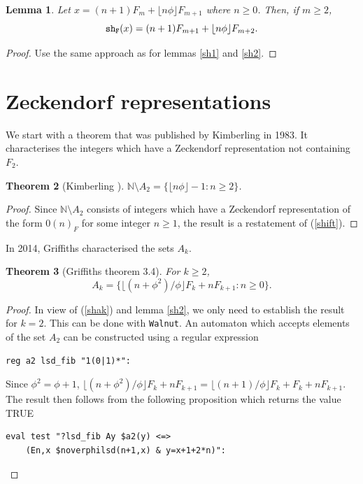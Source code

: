 \documentclass[12pt]{article}
\theoremstyle{plain}
\newtheorem{theorem}{Theorem}
\newtheorem{lemma}[theorem]{Lemma}
\theoremstyle{case}
\theoremstyle{definition}
\begin{document}
\bigskip

\begin{lemma}
\label{sh4}
Let $x =  (n+1) F_{m} + \lfloor n \phi \rfloor F_{m+1}$  where $n \geq 0$. Then, if $m \geq 2$,
$$
{\tt sh_F} (x)  =  (n+1) F_{m+1} + \lfloor n \phi \rfloor F_{m+2}.
$$
\end{lemma}
\begin{proof}
Use the same approach as for lemmas \ref{sh1} and \ref{sh2}.
\end{proof}

\bigskip

\section{Zeckendorf representations}
\label{zecksec}

We start with a theorem that was published by Kimberling in 1983. It characterises the integers which have a Zeckendorf representation not containing $F_2$.

\bigskip

\begin{theorem}[Kimberling \cite{Kimberling_1983}]
\label{kimb}
$\mathbb{N} \setminus A_2 = \{ \lfloor n \phi \rfloor - 1 : n \geq 2 \}$.
\end{theorem}
\begin{proof}
Since $\mathbb{N} \setminus A_2$ consists of integers which have a Zeckendorf representation of the form $0 (n)_F$ for some integer $n \geq 1$, the result is a restatement of (\ref{shift}).\end{proof}

\bigskip

In 2014, Griffiths characterised the sets $A_k$.

\bigskip

\begin{theorem}[Griffiths \cite{Griffiths_2014} theorem 3.4]
For $k \geq 2$, 
$$
A_k =  \{  \lfloor (n+ \phi^2)/\phi \rfloor F_k + n F_{k+1} : n \geq 0 \}.
$$
\end{theorem}
\begin{proof}
In view of (\ref{shak}) and lemma \ref{sh2}, we only need to establish the result for $k = 2$. This can be done with {\tt Walnut}. An automaton which accepts elements of the set $A_2$ can be constructed using a regular expression
\begin{verbatim}
reg a2 lsd_fib "1(0|1)*":
\end{verbatim}
Since $\phi^2 = \phi + 1$,  $\lfloor (n+ \phi^2)/\phi \rfloor F_k + n F_{k+1} =  \lfloor (n+ 1)/\phi \rfloor F_k + F_k + n F_{k+1}$. The result then follows from the following proposition which returns the value TRUE
\begin{verbatim}
eval test "?lsd_fib Ay $a2(y) <=> 
    (En,x $noverphilsd(n+1,x) & y=x+1+2*n)":
\end{verbatim}
\end{proof}
\end{document}
